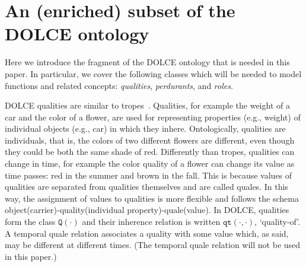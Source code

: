 \documentclass[sw]{iosart2x}
\newcommand{\generalStyle}[1]{\texttt{#1}}
\newcommand{\biRel}[3]{\generalStyle{#1}(#2,#3)}
\newcommand{\uniRel}[2]{\generalStyle{#1}(#2)}
\newcommand{\DOLCE}{\textsc{DOLCE}\xspace} %
\newcommand{\DOLCEQuality}[1]{\uniRel{Q}{#1}}
\newcommand{\DOLCEQualityDirect}[2]{\biRel{qt}{#1}{#2}}
\newcommand{\firstTimeKeyWord}[1]{\textit{#1}}
\newcommand{\quotes}[1]{`#1'}
\newcommand{\TODOinline}[1]{{%
}}
\begin{document}

\section{An (enriched) subset of the \DOLCE ontology\label{sec:DOLCE}} 
Here we introduce the fragment of the \DOLCE ontology \cite{masoloWonderWebDeliverableD182003,borgoDOLCEDescriptiveOntology2022} that is needed in this paper. In particular, we cover the following classes which will be needed to model functions and related concepts: \firstTimeKeyWord{qualities}, \firstTimeKeyWord{perdurants}, and \firstTimeKeyWord{roles}. 

\DOLCE qualities are similar to tropes~\cite{Campbell90}. Qualities, for example the weight of a car and the color of a flower, are used for representing properties (e.g., weight) of individual objects (e.g., car) in which they inhere.
Ontologically, qualities are individuals, that is, the colors of two different flowers are different, even though they could be both the same shade of red.
Differently than tropes, qualities can change in time, for example the color quality of a flower can change its value as time passes: red in the summer and brown in the fall.
This is because values of qualities are separated from qualities themselves and are called quales. 
In this way, the assignment of values to qualities is more flexible and follows the schema object(carrier)-quality(individual property)-quale(value).
In \DOLCE, qualities form the class $\DOLCEQuality{\cdot}$ and their inherence relation is written $\DOLCEQualityDirect{\cdot}{\cdot}$, \quotes{quality-of}. A temporal quale relation associates a quality with some value which, as said, may be different at different times. (The temporal quale relation will not be used in this paper.)
\end{document}
